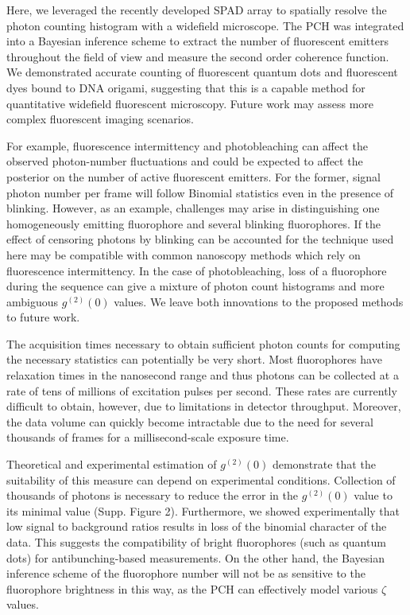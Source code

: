 
Here, we leveraged the recently developed SPAD array to spatially resolve the photon counting histogram with a widefield microscope. The PCH was integrated into a Bayesian inference scheme to extract the number of fluorescent emitters throughout the field of view and measure the second order coherence function. We demonstrated accurate counting of fluorescent quantum dots and fluorescent dyes bound to DNA origami, suggesting that this is a capable method for quantitative widefield fluorescent microscopy. Future work may assess more complex fluorescent imaging scenarios. 

For example, fluorescence intermittency and photobleaching can affect the observed photon-number fluctuations and could be expected to affect the posterior on the number of active fluorescent emitters. For the former, signal photon number per frame will follow Binomial statistics even in the presence of blinking. However, as an example, challenges may arise in distinguishing one homogeneously emitting fluorophore and several blinking fluorophores. If the effect of censoring photons by blinking can be accounted for the technique used here may be compatible with common nanoscopy methods which rely on fluorescence intermittency. In the case of photobleaching, loss of a fluorophore during the sequence can give a mixture of photon count histograms and more ambiguous $g^{(2)}(0)$ values. We leave both innovations to the proposed methods to future work.
 
The acquisition times necessary to obtain sufficient photon counts for computing the necessary statistics can potentially be very short. Most fluorophores have relaxation times in the nanosecond range and thus photons can be collected at a rate of tens of millions of excitation pulses per second. These rates are currently difficult to obtain, however, due to limitations in detector throughput. Moreover, the data volume can quickly become intractable due to the need for several thousands of frames for a millisecond-scale exposure time. 

Theoretical and experimental estimation of $g^{(2)}(0)$ demonstrate that the suitability of this measure can depend on experimental conditions. Collection of thousands of photons is necessary to reduce the error in the $g^{(2)}(0)$ value to its minimal value (Supp. Figure 2). Furthermore, we showed experimentally that low signal to background ratios results in loss of the binomial character of the data. This suggests the compatibility of bright fluorophores (such as quantum dots) for antibunching-based measurements. On the other hand, the Bayesian inference scheme of the fluorophore number will not be as sensitive to the fluorophore brightness in this way, as the PCH can effectively model various $\zeta$ values. 

